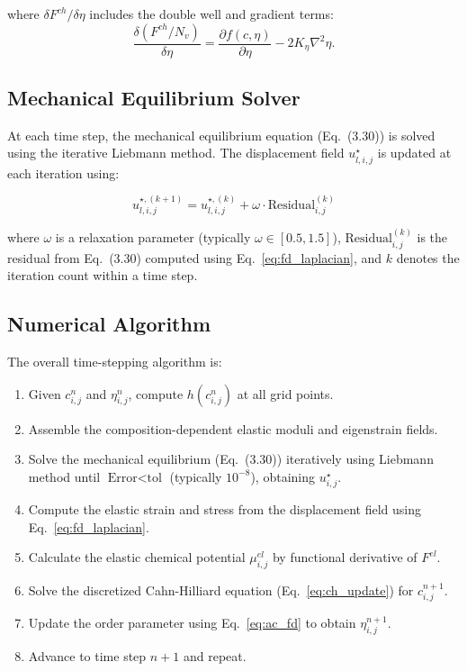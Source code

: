 where $\delta F^{ch}/\delta\eta$ includes the double well and gradient terms:
\begin{equation}
\frac{\delta (F^{ch}/N_v)}{\delta \eta} = \frac{\partial f(c,\eta)}{\partial \eta} - 2K_{\eta}\nabla^2\eta.
\end{equation}

\subsection{Mechanical Equilibrium Solver}

At each time step, the mechanical equilibrium equation (Eq.~(3.30)) is solved using the iterative Liebmann method. The displacement field $u^{\star}_{l,i,j}$ is updated at each iteration using:

\begin{equation}\label{eq:mech_eq_fd}
u_{l,i,j}^{\star,(k+1)} = u_{l,i,j}^{\star,(k)} + \omega \cdot \text{Residual}^{(k)}_{i,j}
\end{equation}

where $\omega$ is a relaxation parameter (typically $\omega \in [0.5, 1.5]$), $\text{Residual}^{(k)}_{i,j}$ is the residual from Eq.~(3.30) computed using Eq.~\eqref{eq:fd_laplacian}, and $k$ denotes the iteration count within a time step.

\subsection{Numerical Algorithm}

The overall time-stepping algorithm is:
\begin{enumerate}
\item Given $c_{i,j}^n$ and $\eta_{i,j}^n$, compute $h(c_{i,j}^n)$ at all grid points.
\item Assemble the composition-dependent elastic moduli and eigenstrain fields.
\item Solve the mechanical equilibrium (Eq.~(3.30)) iteratively using Liebmann method until $\text{Error} < \text{tol}$ (typically $10^{-8}$), obtaining $u^{\star}_{i,j}$.
\item Compute the elastic strain and stress from the displacement field using Eq.~\eqref{eq:fd_laplacian}.
\item Calculate the elastic chemical potential $\mu^{el}_{i,j}$ by functional derivative of $F^{el}$.
\item Solve the discretized Cahn-Hilliard equation (Eq.~\eqref{eq:ch_update}) for $c_{i,j}^{n+1}$.
\item Update the order parameter using Eq.~\eqref{eq:ac_fd} to obtain $\eta_{i,j}^{n+1}$.
\item Advance to time step $n+1$ and repeat.
\end{enumerate}

